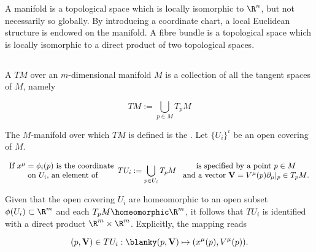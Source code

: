 
A manifold is a topological space which is locally isomorphic to $\R^n$, but not necessarily so globally. By introducing a coordinate chart, a local Euclidean structure is endowed on the manifold. A fibre bundle is a topological space which is locally isomorphic to a direct product of two topological spaces. \medbreak

\subsection{}

A  $TM$ over an $m$-dimensional manifold $M$ is a collection of all the tangent spaces of $M$, namely 

\begin{equation*}
    TM := \bigcup_{p \in M} T_p M
\end{equation*}

The $M$-manifold over which $TM$ is defined is the . Let $\{U_i\}^{i}$ be an open covering of $M$. 

\begin{equation*}
    \begin{array}{cc}
         \textnormal{If $x^{\mu} = \phi_i(p)$ is the coordinate} \\
         \textnormal{ on $U_i$, an element of}
    \end{array}
   T U_i := \bigcup_{p \in U_i} T_p M 
    \begin{array}{cc}
         \textnormal{ is specified by a point $p \in M$} \\
         \textnormal{ and a vector ${\bf V} = V^\mu(p) \partial_{\mu}|_{p} \in T_p M$.}
    \end{array}
\end{equation*}

Given that the open covering $U_i$ are homeomorphic to an open subset $\phi(U_i) \subset \R^m$ and each $T_p M \homeomorphic \R^m$, it follows that $TU_i$ is identified with a direct product $\R^m \times \R^m$. Explicitly, the mapping reads

\begin{equation}
    (p, {\bf V}) \in TU_i: \blanky (p, {\bf V}) \mapsto (x^{\mu}(p), V^{\mu}(p)).
\end{equation}

